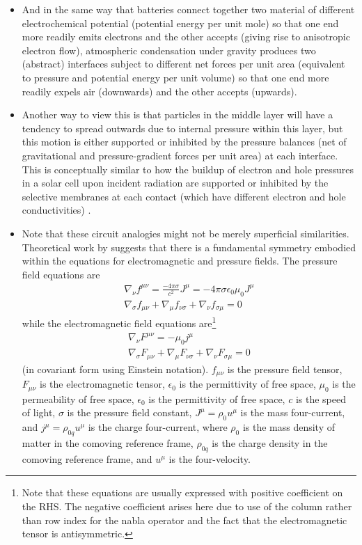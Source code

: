 \begin{itemize}
	\item And in the same way that batteries connect together two material of different electrochemical potential (potential energy per unit mole) so that one end more readily emits electrons and the other accepts (giving rise to anisotropic electron flow), atmospheric condensation under gravity produces two (abstract) interfaces subject to different net forces per unit area (equivalent to pressure and potential energy per unit volume) so that one end more readily expels air (downwards) and the other accepts (upwards).
	\item Another way to view this is that particles in the middle layer will have a tendency to spread outwards due to internal pressure within this layer, but this motion is either supported or inhibited by the pressure balances (net of gravitational and pressure-gradient forces per unit area) at each interface. This is conceptually similar to how the buildup of electron and hole pressures in a solar cell upon incident radiation are supported or inhibited by the selective membranes at each contact (which have different electron and hole conductivities) \citep{wurfel2016}.
	\item Note that these circuit analogies might not be merely superficial similarities. Theoretical work by \citet{fedosin2015} suggests that there is a fundamental symmetry embodied within the equations for electromagnetic and pressure fields. The pressure field equations are
	\begin{eqnarray}
		\nabla_\nu f^{\mu \nu} = \frac{- 4 \pi \sigma}{c^2} J^\mu = -4 \pi \sigma \epsilon_0 \mu_0 J^\mu \\
		\nabla_\sigma f_{\mu \nu} + \nabla_\mu f_{\nu \sigma} + \nabla_\nu f_{\sigma \mu} = 0
	\end{eqnarray}
	while the electromagnetic field equations are\footnote{Note that these equations are usually expressed with positive coefficient on the RHS. The negative coefficient arises here due to use of the column rather than row index for the nabla operator and the fact that the electromagnetic tensor is antisymmetric.}
	\begin{eqnarray}
		\nabla_\nu F^{\mu \nu} = - \mu_0 j^\mu \\
		\nabla_\sigma F_{\mu \nu} + \nabla_\mu F_{\nu \sigma} + \nabla_\nu F_{\sigma \mu} = 0
	\end{eqnarray}
	(in covariant form using Einstein notation). $f_{\mu \nu}$ is the pressure field tensor, $F_{\mu \nu}$ is the electromagnetic tensor, $\epsilon_0$ is the permittivity of free space, $\mu_0$ is the permeability of free space, $\epsilon_0$ is the permittivity of free space, $c$ is the speed of light, $\sigma$ is the pressure field constant, $J^\mu = \rho_0 u^\mu$ is the mass four-current, and $j^\mu = \rho_{0q} u^\mu$ is the charge four-current, where $\rho_0$ is the mass density of matter in the comoving reference frame, $\rho_{0q}$ is the charge density in the comoving reference frame, and $u^\mu$ is the four-velocity.

\end{itemize}
